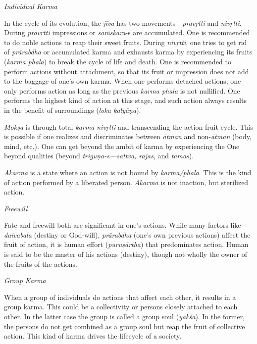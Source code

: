 \noindent
\textit{Individual Karma} 

In the cycle of its evolution, the \textit{jīva} has two movements—\textit{pravṛtti} and \textit{nivṛtti}. During \textit{pravṛtti} impressions or \textit{saṁskāra}-s are accumulated. One is recommended to do noble actions to reap their sweet fruits. During \textit{nivṛtti}, one tries to get rid of \textit{prārabdha} or accumulated karma and exhausts karma by experiencing its fruits (\textit{karma phala}) to break the cycle of life and death. One is recommended to perform actions without attachment, so that its fruit or impression does not add to the baggage of one's own karma. When one performs detached actions, one only performs action as long as the previous \textit{karma phala} is not nullified. One performs the highest kind of action at this stage, and such action always results in the benefit of surroundings (\textit{loka kalyāṇa}). 

\textit{Mokṣa} is through total \textit{karma nivṛtti} and transcending the action-fruit cycle. This is possible if one realizes and discriminates between \textit{ātman} and non-\textit{ātman} (body, mind, etc.). One can get beyond the ambit of karma by experiencing the One beyond qualities (beyond \textit{triguṇa-s—sattva, rajas}, and \textit{tamas}).

\textit{Akarma} is a state where an action is not bound by \textit{karma/phala}. This is the kind of action performed by a liberated person. \textit{Akarma} is not inaction, but sterilized action.

\noindent
\textit{Freewill} 

Fate and freewill both are significant in one's actions. While many factors like \textit{daivabala} (destiny or God-will), \textit{prārabdha} (one's own previous actions) affect the fruit of action, it is human effort (\textit{puruṣārtha}) that predominates action. Human is said to be the master of his actions (destiny), though not wholly the owner of the fruits of the actions.

\noindent
\textit{Group Karma} 

When a group of individuals do actions that affect each other, it results in a group karma. This could be a collectivity or persons closely attached to each other. In the latter case the group is called a group soul (\textit{yakśa}). In the former, the persons do not get combined as a group soul but reap the fruit of collective action. This kind of karma drives the lifecycle of a society.

